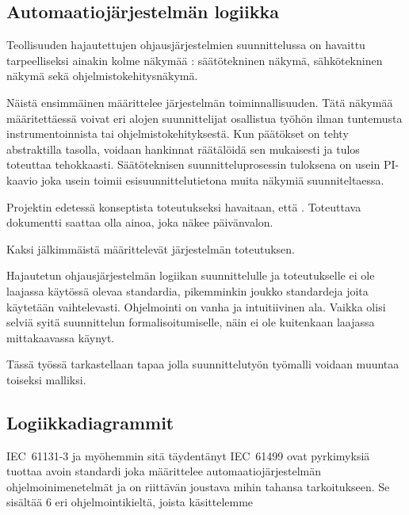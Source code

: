 \documentclass[finnish,12pt]{article}
\begin{document}

	\subsection{Automaatiojärjestelmän logiikka}

Teollisuuden hajautettujen ohjausjärjestelmien suunnittelussa on havaittu tarpeelliseksi ainakin kolme näkymää \cite{RefWorks:38}: säätötekninen näkymä, sähkötekninen näkymä sekä ohjelmistokehitysnäkymä.

Näistä ensimmäinen määrittelee järjestelmän toiminnallisuuden. Tätä näkymää määritettäessä voivat eri alojen suunnittelijat osallistua työhön ilman tuntemusta instrumentoinnista tai ohjelmistokehityksestä. Kun päätökset on tehty abstraktilla tasolla, voidaan hankinnat räätälöidä sen mukaisesti ja tulos toteuttaa tehokkaasti. Säätöteknisen suunnitteluprosessin tuloksena on usein PI-kaavio joka usein toimii esisuunnittelutietona muita näkymiä suunniteltaessa.

Projektin edetessä konseptista toteutukseksi havaitaan, että . Toteuttava dokumentti saattaa olla ainoa, joka näkee päivänvalon. 

Kaksi jälkimmäistä määrittelevät järjestelmän toteutuksen. 

Hajautetun ohjausjärjestelmän logiikan suunnittelulle ja toteutukselle ei ole laajassa käytössä olevaa standardia, pikemminkin joukko standardeja joita käytetään vaihtelevasti. Ohjelmointi on vanha ja intuitiivinen ala. Vaikka olisi selviä syitä suunnittelun formalisoitumiselle, näin ei ole kuitenkaan laajassa mittakaavassa käynyt.

Tässä työssä tarkastellaan tapaa jolla suunnittelutyön työmalli voidaan muuntaa toiseksi malliksi.

	\subsection{Logiikkadiagrammit}

IEC~61131-3 ja myöhemmin sitä täydentänyt IEC~61499 ovat pyrkimyksiä tuottaa avoin standardi joka määrittelee automaatiojärjestelmän ohjelmoinimenetelmät ja on riittävän joustava mihin tahansa tarkoitukseen. Se sisältää 6 eri ohjelmointikieltä, joista käsittelemme
\end{document}
